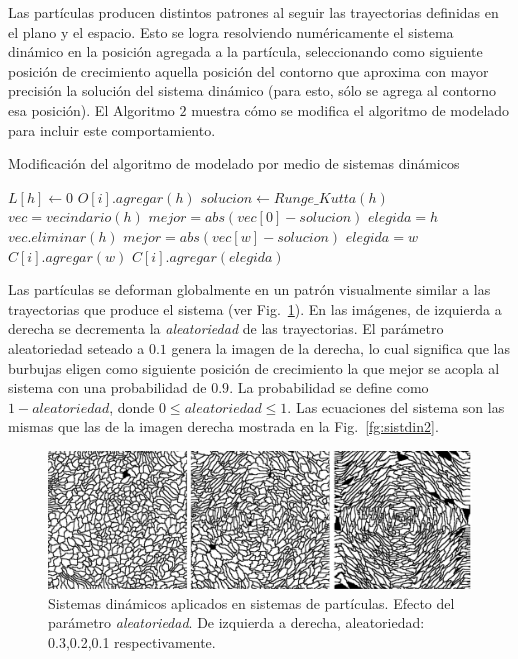 Las part\'iculas producen distintos patrones al seguir las trayectorias definidas en el plano y el espacio.
Esto se logra resolviendo num\'ericamente el sistema din\'amico en la posici\'on agregada a la part\'icula, seleccionando como siguiente posici\'on de crecimiento aquella posici\'on del contorno que aproxima con mayor precisión la soluci\'on del sistema din\'amico (para esto, sólo se agrega al contorno esa posición).
El Algoritmo $2$ muestra cómo se modifica el algoritmo de modelado para incluir este comportamiento.

\begin{algorithm}[h!]
\caption{Modificación del algoritmo de modelado por medio de sistemas dinámicos}
\begin{algorithmic}
\State $L[h]\gets 0$ 
\State $O[i].agregar(h)$
\State $solucion \gets Runge\_Kutta(h)$
\State $vec = vecindario(h)$
\State $mejor = abs(vec[0] - solucion)$
\State $elegida = h$
\State $vec.eliminar(h)$
        \State $mejor = abs(vec[w]-solucion)$
        \State $elegida = w$
    \EndIf
        \State $C[i].agregar(w)$
    \EndIf
\EndFor
{}
\State $C[i].agregar(elegida)$
\end{algorithmic}
\end{algorithm}

Las part\'iculas se deforman globalmente en un patr\'on visualmente similar a las trayectorias que produce el sistema (ver Fig.~\ref{fg:sistdin3}).
En las im\'agenes, de izquierda a derecha se decrementa la {\em aleatoriedad} de las trayectorias.
El par\'ametro aleatoriedad seteado a $0.1$ genera la imagen de la derecha, lo cual significa que las burbujas eligen como siguiente posición de crecimiento la que mejor se acopla al sistema con una probabilidad de $0.9$.
La probabilidad se define como $1-aleatoriedad$, donde $0 \leq aleatoriedad \leq 1$.
Las ecuaciones del sistema son las mismas que las de la imagen derecha mostrada en la Fig.~\ref{fg:sistdin2}.

\begin{figure}[htb!]
  \centerline{\includegraphics[width=13cm]{figures/Fig3}}
  \caption[Sistemas din\'amicos aplicados en sistemas de part\'iculas]{Sistemas din\'amicos aplicados en sistemas de part\'iculas. Efecto del parámetro {\em aleatoriedad}. De izquierda a derecha, aleatoriedad: 0.3,0.2,0.1 respectivamente. }
  \label{fg:sistdin3}
\end{figure}

